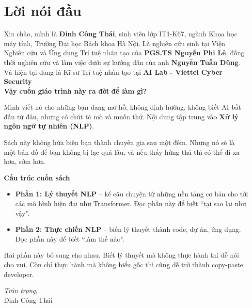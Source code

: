 \chapter*{Lời nói đầu}

\noindent
Xin chào, mình là \textbf{Đinh Công Thái}, sinh viên lớp IT1-K67, ngành Khoa học máy tính, Trường Đại học Bách khoa Hà Nội. Là nghiên cứu sinh tại Viện Nghiên cứu và Ứng dụng Trí tuệ nhân tạo của \textbf{PGS.TS Nguyễn Phi Lê}, đồng thời nghiên cứu và làm việc dưới sự hướng dẫn của anh \textbf{Nguyễn Tuấn Dũng}. Và hiện tại đang là Kĩ sư Trí tuệ nhân tạo tại \textbf{AI Lab - Viettel Cyber Security}\\


\vspace{1em}
\noindent
\textbf{Vậy cuốn giáo trình này ra đời để làm gì?}  

Mình viết nó cho những bạn đang mơ hồ, không định hướng, không biết AI bắt đầu từ đâu, nhưng có chút tò mò và muốn thử. Nội dung tập trung vào \textbf{Xử lý ngôn ngữ tự nhiên (NLP)}.

Sách này không hứa biến bạn thành chuyên gia sau một đêm. Nhưng nó sẽ là một bản đồ để bạn không bị lạc quá lâu, và nếu thấy hứng thú thì có thể đi xa hơn, sớm hơn.

\vspace{1em}
\noindent
\textbf{Cấu trúc cuốn sách}  

\begin{itemize}[leftmargin=*]
    \item \textbf{Phần 1: Lý thuyết NLP} – kể câu chuyện từ những nền tảng cơ bản cho tới các mô hình hiện đại như Transformer. Đọc phần này để biết “tại sao lại như vậy”.  
    \item \textbf{Phần 2: Thực chiến NLP} – biến lý thuyết thành code, dự án, ứng dụng. Đọc phần này để biết “làm thế nào”.  
\end{itemize}

Hai phần này bổ sung cho nhau. Biết lý thuyết mà không thực hành thì dễ nói cho vui. Còn chỉ thực hành mà không hiểu gốc thì cũng dễ trở thành copy-paste developer.  

\begin{flushright}
\textit{Trân trọng,} \\[0.5em]
Đinh Công Thái
\end{flushright}
